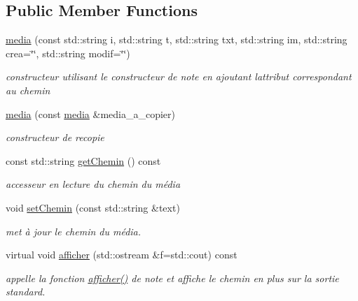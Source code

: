 \subsection*{Public Member Functions}
\begin{DoxyCompactItemize}
\item 
\hyperlink{classmedia_a672a7ed2084d2b0d4928dd076bda3919}{media} (const std\+::string i, std\+::string t, std\+::string txt, std\+::string im, std\+::string crea=\char`\"{}\char`\"{}, std\+::string modif=\char`\"{}\char`\"{})
\begin{DoxyCompactList}\small\item\em constructeur utilisant le constructeur de note en ajoutant l\textquotesingle{}attribut correspondant au chemin \end{DoxyCompactList}\item 
\mbox{\label{classmedia_a57057824b696efef18a77f814ef086af}} 
\hyperlink{classmedia_a57057824b696efef18a77f814ef086af}{media} (const \hyperlink{classmedia}{media} \&media\+\_\+a\+\_\+copier)
\begin{DoxyCompactList}\small\item\em constructeur de recopie \end{DoxyCompactList}\item 
\mbox{\label{classmedia_ae9e1c7e0038e5b8036c1f06871ecd19a}} 
const std\+::string \hyperlink{classmedia_ae9e1c7e0038e5b8036c1f06871ecd19a}{get\+Chemin} () const
\begin{DoxyCompactList}\small\item\em accesseur en lecture du chemin du média \end{DoxyCompactList}\item 
void \hyperlink{classmedia_a9e44b8025a205867c9f853d160da1f6e}{set\+Chemin} (const std\+::string \&text)
\begin{DoxyCompactList}\small\item\em met à jour le chemin du média. \end{DoxyCompactList}\item 
\mbox{\label{classmedia_a94e61f8a8d8588dfe947d4a6badd8a93}} 
virtual void \hyperlink{classmedia_a94e61f8a8d8588dfe947d4a6badd8a93}{afficher} (std\+::ostream \&f=std\+::cout) const
\begin{DoxyCompactList}\small\item\em appelle la fonction \hyperlink{classmedia_a94e61f8a8d8588dfe947d4a6badd8a93}{afficher()} de note et affiche le chemin en plus sur la sortie standard. \end{DoxyCompactList}\end{DoxyCompactItemize}
